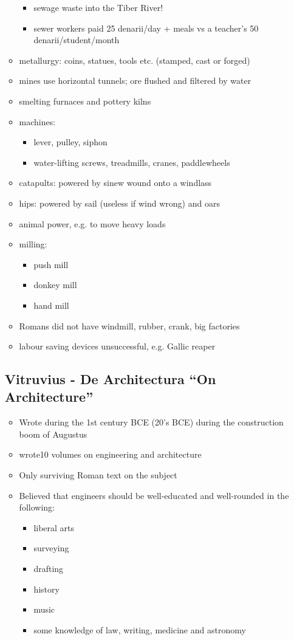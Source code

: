 \documentclass[12pt, twoside]{article}
\begin{document}
\begin{itemize}
\begin{itemize}
\begin{itemize}
	\item sewage waste into the Tiber River!
	\item sewer workers paid 25 denarii/day + meals vs a teacher’s 50 denarii/student/month
	\end{itemize}
\item metallurgy: coins, statues, tools etc. (stamped, cast or forged)
\item mines use horizontal tunnels; ore flushed and filtered by water
\item smelting furnaces and pottery kilns
\item machines:
	\begin{itemize}
	\item lever, pulley, siphon
	\item water-lifting screws, treadmills, cranes, paddlewheels
	\end{itemize}
\item catapults: powered by sinew wound onto a windlass
\item hips: powered by sail (useless if wind wrong) and oars
\item animal power, e.g. to move heavy loads
\item milling:
	\begin{itemize}
	\item push mill
	\item donkey mill
	\item hand mill
	\end{itemize}
\item Romans did not have windmill, rubber, crank, big factories
\item labour saving devices unsuccessful, e.g. Gallic reaper
\end{itemize}

\subsection{Vitruvius - De Architectura “On Architecture”}
\begin{itemize}
\item Wrote during the 1st century BCE (20’s BCE) during the construction boom of Augustus
\item wrote10 volumes on engineering and architecture
\item Only surviving Roman text on the subject
\item Believed that engineers should be well-educated and well-rounded in the following:
	\begin{itemize}
	\item liberal arts
	\item surveying
	\item drafting
	\item history
	\item music
	\item some knowledge of law, writing, medicine and astronomy
	\end{itemize}
\end{itemize}


\end{itemize}
\end{document}
